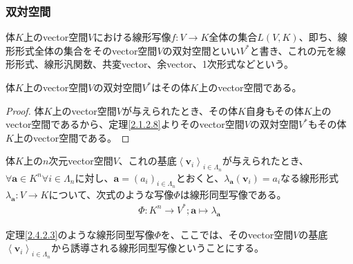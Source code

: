 \documentclass[dvipdfmx]{jsarticle}
\begin{document}
\subsubsection{双対空間}%
\begin{dfn}
体$K$上のvector空間$V$における線形写像$f:V \rightarrow K$全体の集合$L(V,K)$、即ち、線形形式全体の集合をそのvector空間$V$の双対空間といい$V^{*}$と書き、これの元を線形形式、線形汎関数、共変vector、余vector、1次形式などという。
\end{dfn}
\begin{thm}\label{2.4.2.2}
体$K$上のvector空間$V$の双対空間$V^{*}$はその体$K$上のvector空間である。
\end{thm}
\begin{proof}
体$K$上のvector空間$V$が与えられたとき、その体$K$自身もその体$K$上のvector空間であるから、定理\ref{2.1.2.8}よりそのvector空間$V$の双対空間$V^{*}$もその体$K$上のvector空間である。
\end{proof}
\begin{thm}\label{2.4.2.3}
体$K$上の$n$次元vector空間$V$、これの基底$\left\langle \mathbf{v}_{i} \right\rangle_{i \in \varLambda_{n}}$が与えられたとき、$\forall\mathbf{a} \in K^{n}\forall i \in \varLambda_{n}$に対し、$\mathbf{a} = \left( a_{i} \right)_{i \in \varLambda_{n}}$とおくと、$\lambda_{\mathbf{a}}\left( \mathbf{v}_{i} \right) = a_{i}$なる線形形式$\lambda_{\mathbf{a}}:V \rightarrow K$について、次式のような写像$\varPhi$は線形同型写像である。
\begin{align*}
\varPhi:K^{n} \rightarrow V^{*};\mathbf{a} \mapsto \lambda_{\mathbf{a}}
\end{align*}
\end{thm}
\begin{dfn} 定理\ref{2.4.2.3}のような線形同型写像$\varPhi$を、ここでは、そのvector空間$V$の基底$\left\langle \mathbf{v}_{i} \right\rangle_{i \in \varLambda_{n}}$から誘導される線形同型写像ということにする。
\end{dfn}
\end{document}
